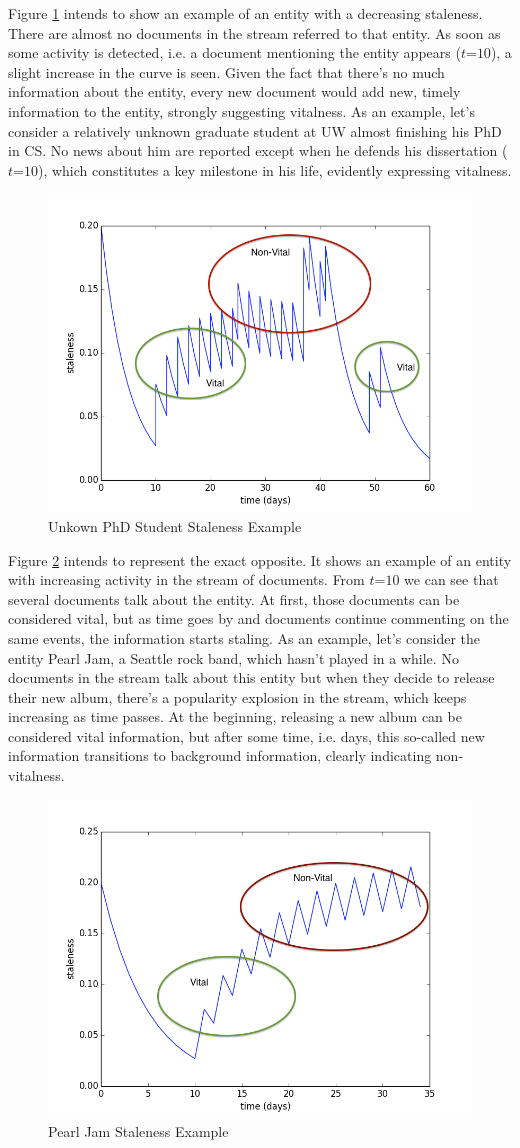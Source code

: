 \documentclass{article}
\begin{document}
Figure \ref{stalenesslow} intends to show an example of an entity with a decreasing staleness. There are almost no documents in the stream referred to that entity. As soon as some activity is detected, i.e. a document mentioning the entity appears ($t\mathord{=}10$), a slight increase in the curve is seen. Given the fact that there's no much information about the entity, every new document would add new, timely information to the entity, strongly suggesting vitalness. As an example, let's consider a relatively unknown graduate student at UW almost finishing his PhD in CS. No news about him are reported except when he defends his dissertation ($t\mathord{=}10$), which constitutes a key milestone in his life, evidently expressing vitalness.

\begin{figure}[h!]
\centering
\includegraphics[width=.5\textwidth]{staleness2.png}
\caption{Unkown PhD Student Staleness Example}
\label{stalenesslow}
\end{figure}

Figure \ref{stalenesshigh} intends to represent the exact opposite. It shows an example of an entity with increasing activity in the stream of documents. From $t\mathord{=}10$ we can see that several documents talk about the entity. At first, those documents can be considered vital, but as time goes by and documents continue commenting on the same events, the information starts staling. As an example, let's consider the entity Pearl Jam, a Seattle rock band, which hasn't played in a while. No documents in the stream talk about this entity but when they decide to release their new album, there's a popularity explosion in the stream, which keeps increasing as time passes. At the beginning, releasing a new album can be considered vital information, but after some time, i.e. days, this so-called new information transitions to background information, clearly indicating non-vitalness.

\begin{figure}[h!]
\centering
\includegraphics[width=.5\textwidth]{staleness3.png}
\caption{Pearl Jam Staleness Example}
\label{stalenesshigh}
\end{figure}
\end{document}
